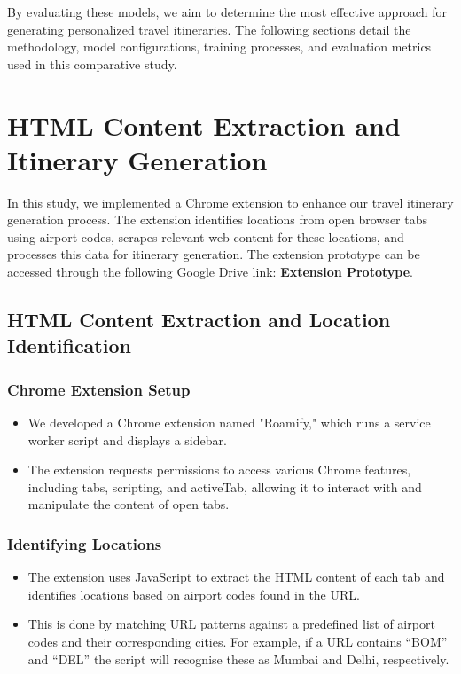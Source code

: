 \documentclass[conference]{IEEEtran}
\begin{document}
    By evaluating these models, we aim to determine the most effective approach for generating personalized travel itineraries. The following sections detail the methodology, model configurations, training processes, and evaluation metrics used in this comparative study.

\section{HTML Content Extraction and Itinerary Generation}

    In this study, we implemented a Chrome extension to enhance our travel itinerary generation process. The extension identifies locations from open browser tabs using airport codes, scrapes relevant web content for these locations, and processes this data for itinerary generation.
    The extension prototype can be accessed through the following Google Drive link: \href{https://drive.google.com/file/d/1qkj995W8CXmMslBy-55xUxxnHPPIOsoV/view?usp=sharing}{\textbf{Extension Prototype}}.

    \subsection{HTML Content Extraction and Location Identification}

        \subsubsection{Chrome Extension Setup}
        \begin{itemize}
            \item We developed a Chrome extension named "Roamify," which runs a service worker script and displays a sidebar.
            \item The extension requests permissions to access various Chrome features, including tabs, scripting, and activeTab, allowing it to interact with and manipulate the content of open tabs.
        \end{itemize}
        
        \subsubsection{Identifying Locations}
        \begin{itemize}
            \item The extension uses JavaScript to extract the HTML content of each tab and identifies locations based on airport codes found in the URL.
            \item This is done by matching URL patterns against a predefined list of airport codes and their corresponding cities. For example, if a URL contains “BOM” and “DEL” the script will recognise these as Mumbai and Delhi, respectively.
        \end{itemize}
\end{document}
